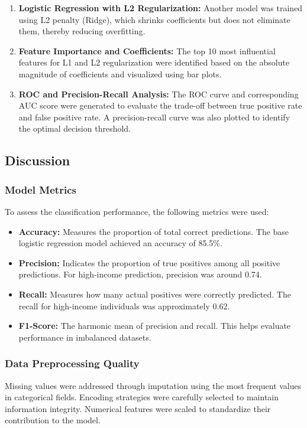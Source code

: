 \documentclass[a4paper,12pt]{article}
\begin{document}
\begin{enumerate}
    \item \textbf{Logistic Regression with L2 Regularization:} Another model was trained using L2 penalty (Ridge), which shrinks coefficients but does not eliminate them, thereby reducing overfitting.

    \item \textbf{Feature Importance and Coefficients:} The top 10 most influential features for L1 and L2 regularization were identified based on the absolute magnitude of coefficients and visualized using bar plots.

    \item \textbf{ROC and Precision-Recall Analysis:} The ROC curve and corresponding AUC score were generated to evaluate the trade-off between true positive rate and false positive rate. A precision-recall curve was also plotted to identify the optimal decision threshold.
\end{enumerate}

\subsection{Discussion}

\subsubsection*{Model Metrics}
To assess the classification performance, the following metrics were used:

\begin{itemize}
    \item \textbf{Accuracy:} Measures the proportion of total correct predictions. The base logistic regression model achieved an accuracy of 85.5\%.
    \item \textbf{Precision:} Indicates the proportion of true positives among all positive predictions. For high-income prediction, precision was around 0.74.
    \item \textbf{Recall:} Measures how many actual positives were correctly predicted. The recall for high-income individuals was approximately 0.62.
    \item \textbf{F1-Score:} The harmonic mean of precision and recall. This helps evaluate performance in imbalanced datasets.
\end{itemize}

\subsubsection*{Data Preprocessing Quality}
Missing values were addressed through imputation using the most frequent values in categorical fields. Encoding strategies were carefully selected to maintain information integrity. Numerical features were scaled to standardize their contribution to the model.
\end{document}
